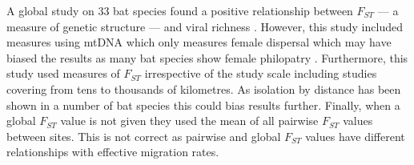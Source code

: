 A global study on 33 bat species found a positive relationship between $F_{ST}$ --- a measure of genetic structure --- and viral richness \cite{turmelle2009correlates}. 
However, this study included measures using mtDNA which only measures female dispersal which may have biased the results as many bat species show female philopatry \cite{kerth2002extreme, hulva2010mechanisms}.
Furthermore, this study used measures of $F_{ST}$ irrespective of the study scale including studies covering from tens \cite{mccracken1981social} to thousands \cite{petit1999male} of kilometres.
As isolation by distance has been shown in a number of bat species \cite{burland1999population, hulva2010mechanisms, o2015genetic, vonhof2015range} this could bias results further.
Finally, when a global $F_{ST}$ value is not given they used the mean of all pairwise $F_{ST}$ values between sites.
This is not correct as pairwise and global $F_{ST}$ values have different relationships with effective migration rates. 




